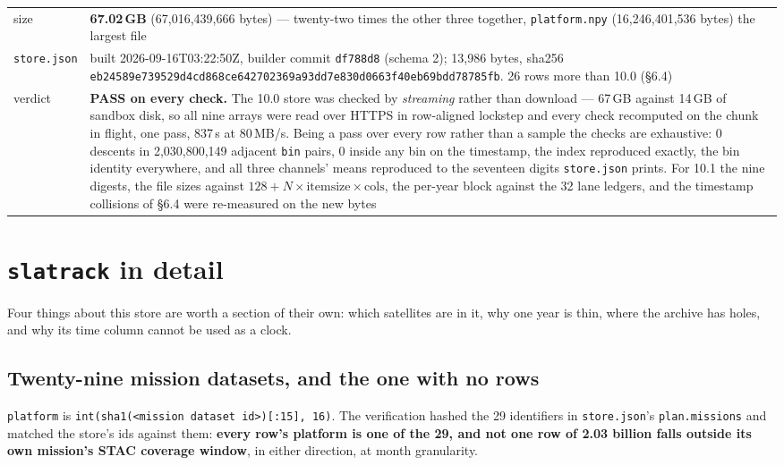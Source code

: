 \documentclass[10pt]{article}
\newcommand{\code}[1]{\texttt{#1}}
\begin{document}
\begin{table}[h]
\begin{tabular}{@{}>{\raggedright\arraybackslash}p{2.8cm}>{\raggedright\arraybackslash}p{12.5cm}@{}}
size & \textbf{67.02\,GB} (67,016,439,666 bytes) --- twenty-two times the other three together, \code{platform.npy} (16,246,401,536 bytes) the largest file \\
\code{store.json} & built 2026-09-16T03:22:50Z, builder commit \code{df788d8} (schema 2); 13,986 bytes, sha256 \code{eb24589e739529d4cd868ce642702369a93dd7e830d0663f40eb69bdd78785fb}. 26 rows more than 10.0 (\S6.4) \\
verdict & \textbf{PASS on every check.} The 10.0 store was checked by \emph{streaming} rather than download --- 67\,GB against 14\,GB of sandbox disk, so all nine arrays were read over HTTPS in row-aligned lockstep and every check recomputed on the chunk in flight, one pass, 837\,s at 80\,MB/s. Being a pass over every row rather than a sample the checks are exhaustive: 0 descents in 2,030,800,149 adjacent \code{bin} pairs, 0 inside any bin on the timestamp, the index reproduced exactly, the bin identity everywhere, and all three channels' means reproduced to the seventeen digits \code{store.json} prints. For 10.1 the nine digests, the file sizes against $128 + N\times\text{itemsize}\times\text{cols}$, the per-year block against the 32 lane ledgers, and the timestamp collisions of \S6.4 were re-measured on the new bytes \\
\bottomrule
\end{tabular}
\end{table}

\section{\code{slatrack} in detail}

Four things about this store are worth a section of their own: which satellites
are in it, why one year is thin, where the archive has holes, and why its time
column cannot be used as a clock.

\subsection{Twenty-nine mission datasets, and the one with no rows}

\code{platform} is \code{int(sha1(<mission dataset id>)[:15], 16)}. The
verification hashed the 29 identifiers in \code{store.json}'s
\code{plan.missions} and matched the store's ids against them: \textbf{every
row's platform is one of the 29, and not one row of 2.03 billion falls outside
its own mission's STAC coverage window}, in either direction, at month
granularity.
\end{document}
